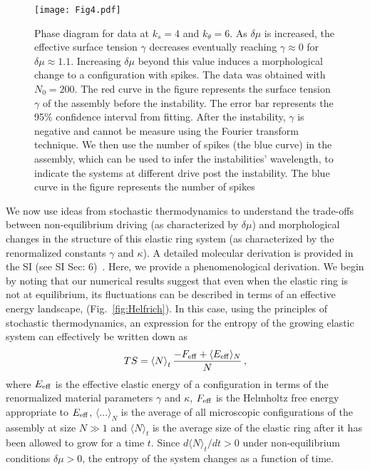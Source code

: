 \documentclass[amsmath,preprintnumbers,10pt,nofootinbib,prl,twocolumn]{revtex4-1}
\begin{document}
\begin{figure}[tbb]
\centering
\texttt{[image: Fig4.pdf]}
\caption{Phase diagram for data at $k_s=4$ and $k_\theta = 6$. As $\delta\mu$ is increased, the effective surface tension $\gamma$ decreases eventually reaching $\gamma\approx 0$ for $\delta\mu \approx 1.1$.  Increasing $\delta \mu$ beyond this value induces a morphological change to a configuration with spikes. The data was obtained with $N_0=200$. The red curve in the figure represents the surface tension $\gamma$ of the assembly before the instability. The error bar represents the 95\% confidence interval from fitting. After the instability, $\gamma$ is negative and cannot be measure using the Fourier transform technique. We then use the number of spikes (the blue curve) in the assembly, which can be used to infer the instabilities' wavelength, to indicate the systems at different drive post the instability. The blue curve in the figure represents the number of spikes} \label{fig:HelfrichInstability}
\end{figure}

 We now use ideas from stochastic thermodynamics to understand the trade-offs between non-equilibrium driving (as characterized by $\delta \mu$) and morphological changes in the structure of this elastic ring system (as characterized by the renormalized constants $\gamma$ and $\kappa$). A detailed molecular derivation is provided in the SI (see SI Sec: 6)~\cite{Supplementary}. Here, we provide a phenomenological derivation. We begin by noting that our numerical results suggest that even when the elastic ring is not at equilibrium, its fluctuations can be described in terms of an effective energy landscape, (Fig.~\ref{fig:Helfrich}). In this case, using the principles of stochastic thermodynamics, an expression for the entropy of the growing elastic system can effectively be written down as~\cite{Nguyen2016,Esposito2012}
\begin{equation}
\label{eq:entropysystem}
 TS=\left\langle N \right\rangle_t \frac{-F_{\rm{eff}} + \langle E_{\rm{eff}} \rangle _N}{N}\,,
\end{equation}
where $E_{\rm{eff}}$ is the effective elastic energy of a configuration in terms of the renormalized material parameters $\gamma$ and $\kappa$, $F_{\rm{eff}}$ is the Helmholtz free energy appropriate to $E_{\rm{eff}}$, $\langle...\rangle_N$ is the average of all microscopic configurations of the assembly at size $N\gg 1$ and $\langle N \rangle_t$ is the average size of the elastic ring after it has been allowed to grow for a time $t$. Since $d\langle N \rangle_t/dt > 0$ under non-equilibrium conditions $\delta\mu >0$, the entropy of the system changes as a function of time. 
\end{document}
